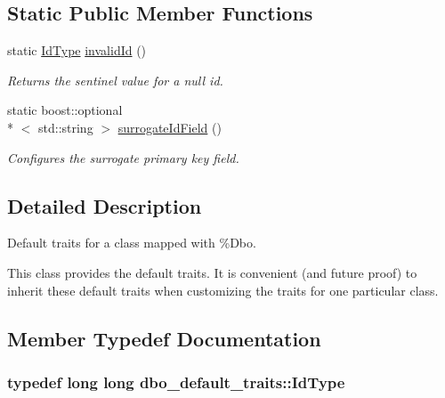 \subsection*{Static Public Member Functions}
\begin{DoxyCompactItemize}
\item 
static \hyperlink{structdbo__default__traits_a01f10d78fdf6ae4a23dff88daa60b8ac}{Id\+Type} \hyperlink{structdbo__default__traits_a63d90a044d84c0c5062ebd2b69713484}{invalid\+Id} ()
\begin{DoxyCompactList}\small\item\em Returns the sentinel value for a {\ttfamily null} id. \end{DoxyCompactList}\item 
static boost\+::optional\\*
$<$ std\+::string $>$ \hyperlink{structdbo__default__traits_a7f0ee1558eb51f77cc1843f5fcf19057}{surrogate\+Id\+Field} ()
\begin{DoxyCompactList}\small\item\em Configures the surrogate primary key field. \end{DoxyCompactList}\end{DoxyCompactItemize}


\subsection{Detailed Description}
Default traits for a class mapped with \%Dbo. 

This class provides the default traits. It is convenient (and future proof) to inherit these default traits when customizing the traits for one particular class. 

\subsection{Member Typedef Documentation}
\hypertarget{structdbo__default__traits_a01f10d78fdf6ae4a23dff88daa60b8ac}{
\subsubsection[{Id\+Type}]{\setlength{\rightskip}{0pt plus 5cm}typedef long long {\bf dbo\+\_\+default\+\_\+traits\+::\+Id\+Type}}}\label{structdbo__default__traits_a01f10d78fdf6ae4a23dff88daa60b8ac}


